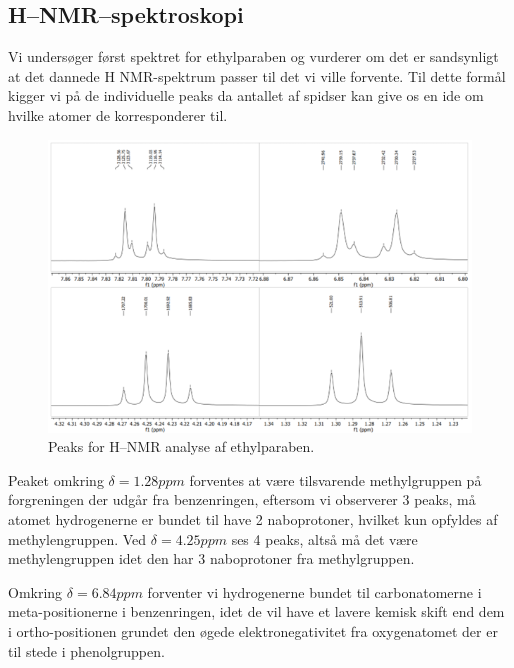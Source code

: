     \subsection{H--NMR--spektroskopi}
    Vi undersøger først spektret for ethylparaben og vurderer om det er sandsynligt at det dannede H NMR-spektrum passer til det vi ville forvente. Til dette formål kigger vi på de individuelle peaks da antallet af spidser kan give os en ide om hvilke atomer de korresponderer til.
    \begin{figure}[H] \centering
        \includegraphics[width=\textwidth]{billeder/ethylpeaks}
        \caption{Peaks for H--NMR analyse af ethylparaben.}
    \end{figure} 
    Peaket omkring $\delta=1.28\si{ppm}$ forventes at være tilsvarende methylgruppen på forgreningen der udgår fra benzenringen, eftersom vi observerer 3 peaks, må atomet hydrogenerne er bundet til have 2 naboprotoner, hvilket kun opfyldes af methylengruppen. Ved $\delta=4.25\si{ppm}$ ses 4 peaks, altså må det være methylengruppen idet den har 3 naboprotoner fra methylgruppen. 
    
    Omkring $\delta=6.84\si{ppm}$ forventer vi hydrogenerne bundet til carbonatomerne i meta-positionerne i benzenringen, idet de vil have et lavere kemisk skift end dem i ortho-positionen grundet den øgede elektronegativitet fra oxygenatomet der er til stede i phenolgruppen. 
    
